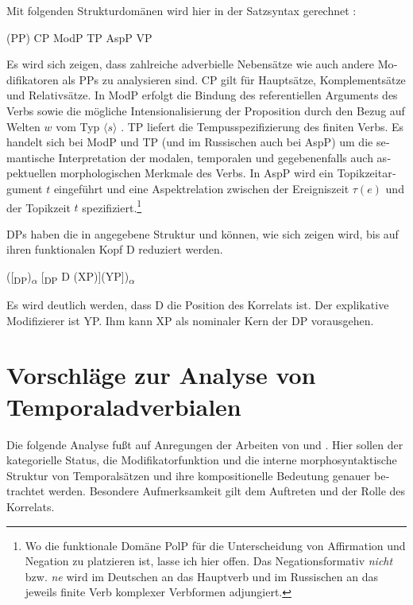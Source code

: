\documentclass[output=paper, colorlinks, citecolor=brown, booklanguage=german]{langscibook}
\begin{document}
\begin{otherlanguage}{german}
\noindent Mit folgenden Strukturdomänen wird hier in der Satzsyntax gerechnet \citep{Zimmermann2016}:

\ea \label{ex:18:7} (PP) CP ModP TP AspP VP
\z

\noindent Es wird sich zeigen, dass zahlreiche adverbielle Nebensätze wie auch andere Mo\-di\-fi\-ka\-to\-ren als PPs zu analysieren sind. CP gilt für Hauptsätze, Komplementsätze und Relativsätze. In ModP erfolgt die Bindung des referentiellen Arguments des Verbs sowie die mögliche Intensionalisierung der Proposition durch den Bezug auf Welten $w$ vom Typ $\langle s \rangle$ \citep{Zimmermann2009,Zimmermann2015a}. TP liefert die Tempusspe\-zi\-fi\-zie\-rung des finiten Verbs. Es handelt sich bei ModP und TP (und im Russischen auch bei AspP) um die semantische Interpretation der modalen, temporalen und gegebenenfalls auch aspektuellen morphologischen Merkmale des Verbs. In AspP wird ein Topikzeitargument $t$ eingeführt und eine Aspektrelation zwischen der Ereigniszeit $\tau(e)$ und der Topikzeit $t$ spezifiziert.\footnote{\label{fn:18:1}Wo die funktionale Domäne PolP für die Unterscheidung von Affirmation und Negation zu platzieren ist, lasse ich hier offen. Das Negationsformativ \textit{nicht} bzw. \textit{ne} wird im Deutschen an das Hauptverb und im Rus\-si\-schen an das jeweils finite Verb komplexer Verbformen adjungiert.}

DPs haben die in  angegebene Struktur und können, wie sich zeigen wird, bis auf ihren funktionalen Kopf D reduziert werden.

\ea \label{ex:18:8} ([\textsubscript{DP})\textsubscript{$\alpha$} [\textsubscript{DP} D (XP)](YP])\textsubscript{$\alpha$}
\z

\noindent Es wird deutlich werden, dass D die Position des Korrelats ist. Der explikative Modifizierer ist YP. Ihm kann XP als nominaler Kern der DP vorausgehen.

\section{Vorschläge zur Analyse von Temporaladverbialen} \label{sec:18:3}

\noindent Die folgende Analyse fußt auf Anregungen der Arbeiten von \citet{Beaver-Condoravdi2003,Gronn2015,Gronn-Stechow2010,Gronn-Stechow2012,Paslawska-Stechow2003,Penka-Stechow2008,Tatevosov2015} und \citet{Gronn-Stechow2013a,Stechow-Gronn2013}. Hier sollen der kategorielle Status, die Modifikatorfunktion und die interne morphosyntaktische Struktur von Temporalsätzen und ihre kompositionelle Bedeutung genauer betrachtet werden. Besondere Aufmerksamkeit gilt dem Auftreten und der Rolle des Korrelats.


\end{otherlanguage}
\end{document}
